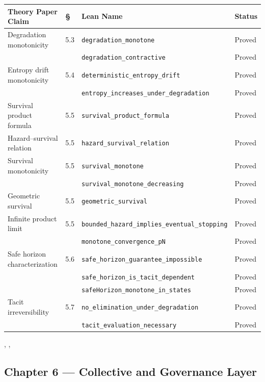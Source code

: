 \begin{center}
\begin{tabular}{p{5.2cm}lp{5.2cm}l}
\toprule
Theory Paper Claim & \S & Lean Name & Status \\
\midrule
Degradation monotonicity
  & 5.3 & \texttt{degradation\_monotone}                & Proved \\
  &     & \texttt{degradation\_contractive}             & Proved \\
Entropy drift monotonicity
  & 5.4 & \texttt{deterministic\_entropy\_drift}        & Proved \\
  &     & \texttt{entropy\_increases\_under\_degradation} & Proved \\
Survival product formula
  & 5.5 & \texttt{survival\_product\_formula}           & Proved \\
Hazard--survival relation
  & 5.5 & \texttt{hazard\_survival\_relation}           & Proved \\
Survival monotonicity
  & 5.5 & \texttt{survival\_monotone}                   & Proved \\
  &     & \texttt{survival\_monotone\_decreasing}       & Proved \\
Geometric survival
  & 5.5 & \texttt{geometric\_survival}                  & Proved \\
Infinite product limit
  & 5.5 & \texttt{bounded\_hazard\_implies\_eventual\_stopping} & Proved \\
  &     & \texttt{monotone\_convergence\_pN}            & Proved \\
Safe horizon characterization
  & 5.6 & \texttt{safe\_horizon\_guarantee\_impossible} & Proved \\
  &     & \texttt{safe\_horizon\_is\_tacit\_dependent}  & Proved \\
  &     & \texttt{safeHorizon\_monotone\_in\_states}    & Proved \\
Tacit irreversibility
  & 5.7 & \texttt{no\_elimination\_under\_degradation}  & Proved \\
  &     & \texttt{tacit\_evaluation\_necessary}         & Proved \\
\bottomrule
\end{tabular}
\end{center}

\noindent{}, ,

\subsection*{Chapter 6 — Collective and Governance Layer}

